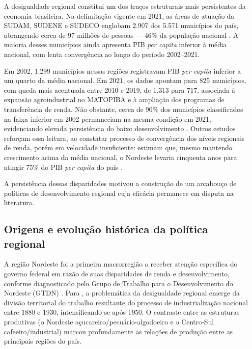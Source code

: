 

A desigualdade regional constitui um dos traços estruturais mais persistentes da economia brasileira. Na delimitação vigente em 2021, as áreas de atuação da SUDAM, SUDENE e SUDECO englobam 2.907 dos 5.571 municípios do país, abrangendo cerca de 97 milhões de pessoas --- 46\% da população nacional \cite{Portugal2024}. A maioria desses municípios ainda apresenta PIB \textit{per capita} inferior à média nacional, com lenta convergência ao longo do período 2002--2021.

Em 2002, 1.299 municípios nessas regiões registravam PIB \textit{per capita} inferior a um quarto da média nacional. Em 2021, os dados apontam para 825 municípios, com queda mais acentuada entre 2010 e 2019, de 1.313 para 717, associada à expansão agroindustrial no MATOPIBA e à ampliação dos programas de transferência de renda. Não obstante, cerca de 90\% dos municípios classificados na faixa inferior em 2002 permaneciam na mesma condição em 2021, evidenciando elevada persistência do baixo desenvolvimento \cite{Portugal2024}. Outros estudos reforçam essa leitura, ao constatar processo de convergência dos níveis regionais de renda, porém em velocidade insuficiente:  estimam que, mesmo mantendo crescimento acima da média nacional, o Nordeste levaria cinquenta anos para atingir 75\% do PIB \textit{per capita} do país \cite{Ferreira1995,Silveira2011,Cruz2025}.

A persistência dessas disparidades motivou a construção de um arcabouço de políticas de desenvolvimento regional cuja eficácia permanece em disputa na literatura.

\subsection{Origens e evolução histórica da política regional}
\label{subsec:origens-evolucao}

A região Nordeste foi a primeira macrorregião a receber atenção específica do governo federal em razão de suas disparidades de renda e desenvolvimento, conforme diagnosticado pelo Grupo de Trabalho para o Desenvolvimento do Nordeste (GTDN) \cite{Portugal2024}. Para , a problemática da desigualdade regional emerge da divisão territorial do trabalho resultante do processo de industrialização nacional entre 1880 e 1930, intensificando-se após 1950. O contraste entre as estruturas produtivas (o Nordeste açucareiro/pecuário-algodoeiro e o Centro-Sul cafeeiro/industrial) marcou profundamente as relações de produção entre as principais regiões do país.

